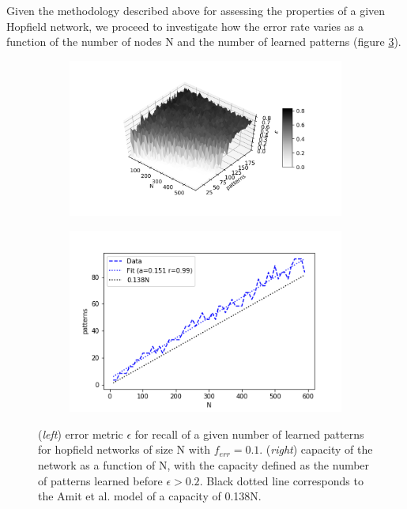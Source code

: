 \documentclass{article}
\begin{document}
Given the methodology described above for assessing the properties of a given Hopfield network, we proceed to investigate how the error rate varies as a function of the number of nodes N and the number of learned patterns (figure \ref{fig:Nsamp}).

\begin{figure}[h]
	\centering
	\begin{subfigure}[t]{0.50\linewidth}
		\centering
		\includegraphics[width = 1.0\linewidth, trim={100 30 50 40}, clip=true]{scan_N_npat.png}
		\label{fig:N}	
	\end{subfigure}%
	\hspace{0.001\linewidth}
	\begin{subfigure}[t]{0.45\linewidth}
		\centering
		\includegraphics[width = 1.0\linewidth, trim={0 7 0 0}, clip=true]{hebb_thresh.png}
		\label{fig:Nthresh}	
	\end{subfigure}%
\caption{(\textit{left}) error metric $\epsilon$ for recall of a given number of learned patterns for hopfield networks of size N with $f_{err} = 0.1$. (\textit{right}) capacity of the network as a function of N, with the capacity defined as the number of patterns learned before $\epsilon > 0.2$.  Black dotted line corresponds to the Amit et al. model of a capacity of 0.138N. }
\label{fig:Nsamp}
\end{figure}
\end{document}
